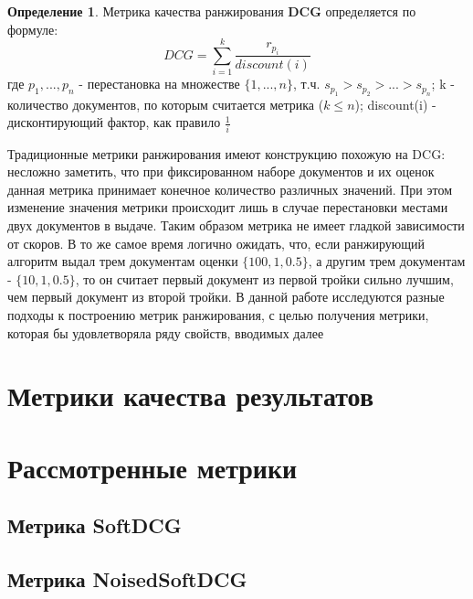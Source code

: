 \documentclass[12pt,a4paper]{amsart}
\theoremstyle{definition}
\newtheorem{definition}{Определение}[section]
\theoremstyle{definition}
\newcommand{\Sum}{\sum\limits}
\renewcommand\b{\textbf}
\begin{document}
\begin{definition}
Метрика качества ранжирования \b{DCG} определяется по формуле:
$$DCG = \Sum_{i=1}^k \frac{r_{p_i}}{discount(i)}$$
где $p_1,...,p_n$ - перестановка на множестве $\{1,...,n\}$, т.ч. ${s_{p_1} > s_{p_2} > ... > s_{p_n}}$; k - количество документов, по которым считается метрика ($k \le n$); 
discount(i) - дисконтирующий фактор, как правило $\frac{1}{i}$
\end{definition}

Традиционные метрики ранжирования имеют конструкцию похожую на DCG: несложно заметить, что при фиксированном наборе документов и их оценок данная метрика принимает конечное количество различных значений. При этом изменение значения метрики происходит лишь в случае перестановки местами двух документов в выдаче. Таким образом метрика не имеет гладкой зависимости от скоров. В то же самое время логично ожидать, что, если ранжирующий алгоритм выдал трем документам оценки $\{100, 1, 0.5\}$, а другим трем документам - $\{10, 1, 0.5\}$, то он считает первый документ из первой тройки сильно лучшим, чем первый документ из второй тройки.
В данной работе исследуются разные подходы к построению метрик ранжирования, с целью получения метрики, которая бы удовлетворяла ряду свойств, вводимых далее


\newpage
\section{Метрики качества результатов}


\newpage
\section{Рассмотренные метрики}

\subsection{Метрика SoftDCG}
\pagebreak


\subsection{Метрика NoisedSoftDCG}
\pagebreak
\end{document}
